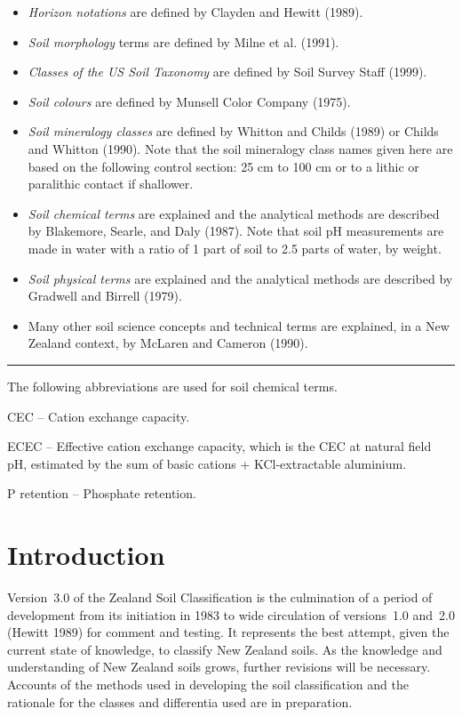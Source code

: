 \documentclass[
  letterpaper,
  DIV=11,
  numbers=noendperiod]{scrreprt}
\providecommand{\tightlist}{%
  \setlength{\itemsep}{0pt}\setlength{\parskip}{0pt}}\usepackage{longtable,booktabs,array}
\begin{document}
\begin{itemize}
\tightlist
\item
  \emph{Horizon notations} are defined by Clayden and Hewitt (1989).
\item
  \emph{Soil morphology} terms are defined by Milne et al. (1991).
\item
  \emph{Classes of the US Soil Taxonomy} are defined by Soil Survey
  Staff (1999).
\item
  \emph{Soil colours} are defined by Munsell Color Company (1975).
\item
  \emph{Soil mineralogy classes} are defined by Whitton and Childs
  (1989) or Childs and Whitton (1990). Note that the soil mineralogy
  class names given here are based on the following control section: 25
  cm to 100 cm or to a lithic or paralithic contact if shallower.
\item
  \emph{Soil chemical terms} are explained and the analytical methods
  are described by Blakemore, Searle, and Daly (1987). Note that soil pH
  measurements are made in water with a ratio of 1 part of soil to 2.5
  parts of water, by weight.
\item
  \emph{Soil physical terms} are explained and the analytical methods
  are described by Gradwell and Birrell (1979).
\item
  Many other soil science concepts and technical terms are explained, in
  a New Zealand context, by McLaren and Cameron (1990).
\end{itemize}

\begin{center}\rule{0.5\linewidth}{0.5pt}\end{center}

The following abbreviations are used for soil chemical terms.

CEC -- Cation exchange capacity.

ECEC -- Effective cation exchange capacity, which is the CEC at natural
field pH, estimated by the sum of basic cations + KCl-extractable
aluminium.

P retention -- Phosphate retention.


\hypertarget{sec-intro}{%
\chapter{Introduction}\label{sec-intro}}

Version~3.0 of the Zealand Soil Classification is the culmination of a
period of development from its initiation in 1983 to wide circulation of
versions~1.0 and~2.0 (Hewitt 1989) for comment and testing. It
represents the best attempt, given the current state of knowledge, to
classify New Zealand soils. As the knowledge and understanding of New
Zealand soils grows, further revisions will be necessary. Accounts of
the methods used in developing the soil classification and the rationale
for the classes and differentia used are in preparation.
\end{document}
